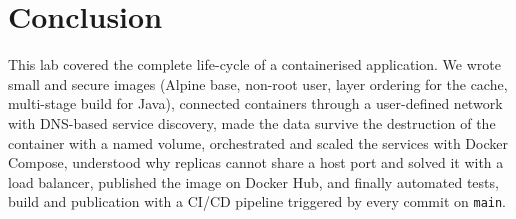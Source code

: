 \documentclass[11pt,a4paper]{article}
\begin{document}
\section{Conclusion}
This lab covered the complete life-cycle of a containerised application. We wrote
small and secure images (Alpine base, non-root user, layer ordering for the cache,
multi-stage build for Java), connected containers through a user-defined network with
DNS-based service discovery, made the data survive the destruction of the container
with a named volume, orchestrated and scaled the services with Docker Compose,
understood why replicas cannot share a host port and solved it with a load balancer,
published the image on Docker Hub, and finally automated tests, build and publication
with a CI/CD pipeline triggered by every commit on \texttt{main}.
\end{document}
